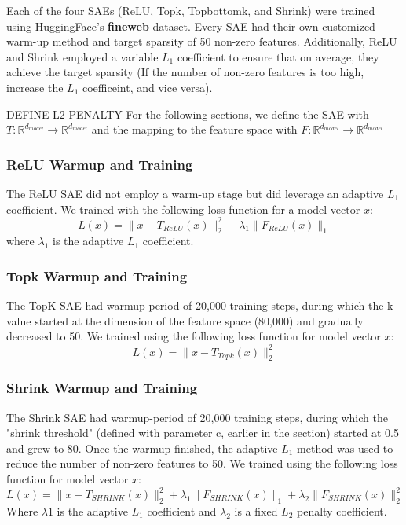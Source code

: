 \documentclass{article}
\begin{document}
Each of the four SAEs (ReLU, Topk, Topbottomk, and Shrink) were trained using HuggingFace's \textbf{fineweb} dataset. Every SAE had their own customized warm-up method and target sparsity of 50 non-zero features. Additionally, ReLU and Shrink employed a variable $L_1$ coefficient to ensure that on average, they achieve the target sparsity (If the number of non-zero features is too high, increase the $L_1$ coefficeint, and vice versa).

DEFINE L2 PENALTY
For the following sections, we define the SAE with $T : \mathbb{R}^{d_{model}} \rightarrow \mathbb{R}^{d_{model}}$ and the mapping to the feature space with $F : \mathbb{R}^{d_{model}} \rightarrow \mathbb{R}^{d_{model}}$

\subsubsection{ReLU Warmup and Training}
    The ReLU SAE did not employ a warm-up stage but did leverage an adaptive $L_1$ coefficient. We trained with the following loss function for a model vector $x$:
    $$
    L(x) = \|x - T_{ReLU}(x)\|_2^2 + \lambda_1\|F_{ReLU}(x)\|_1
    $$
    where $\lambda_1$ is the adaptive $L_1$ coefficient.
    
\subsubsection{Topk Warmup and Training}
    The TopK SAE had warmup-period of 20,000 training steps, during which the k value started at the dimension of the feature space (80,000) and gradually decreased to 50. We trained using the following loss function for model vector $x$:
    $$
    L(x) = \|x - T_{Topk}(x)\|_2^2
    $$

\subsubsection{Shrink Warmup and Training}
    The Shrink SAE had warmup-period of 20,000 training steps, during which the "shrink threshold" (defined with parameter c, earlier in the section) started at 0.5 and grew to 80. Once the warmup finished, the adaptive $L_1$ method was used to reduce the number of non-zero features to 50. We trained using the following loss function for model vector $x$:
    $$
    L(x) = \|x - T_{SHRINK}(x)\|_2^2 + \lambda_1\|F_{SHRINK}(x)\|_1 + \lambda_2 \|F_{SHRINK}(x)\|_2^2
    $$
    Where $\lambda 1$ is the adaptive $L_1$ coefficient and $\lambda_2$ is a fixed $L_2$ penalty coefficient.
    
\end{document}
